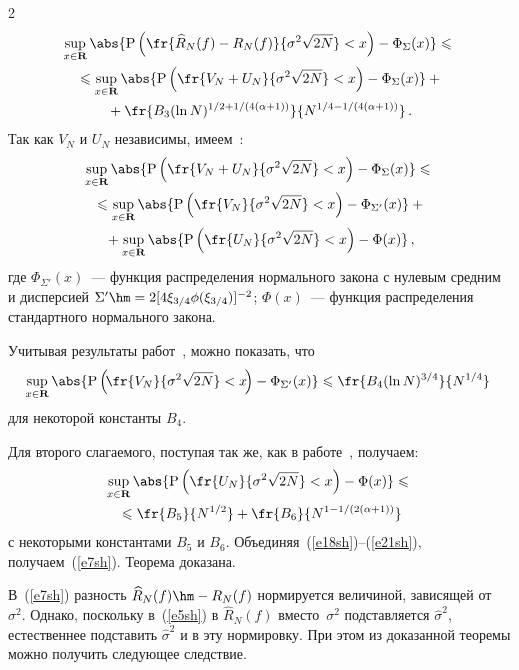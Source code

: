 \begin{multicols}{2}
\noindent
\begin{multline}
\sup\limits_{x\in\mathbf{R}}\abs{\mbox{P}\left
(\fr{\widehat{R}_N(f)-R_N(f)}{\sigma^2\sqrt{2N}}<x\right)-\Phi_\Sigma(x)}\leqslant{}\\
{}\leqslant\sup\limits_{x\in\mathbf{R}}\abs{\mbox{P}\left(
\fr{V_N+U_N}{\sigma^2\sqrt{2N}}<x\right)-\Phi_\Sigma(x)}+{}\\
{}+
\fr{B_3(\ln N)^{{1}/{2}+{1}/(4(\alpha+1))}}{N^{{1}/{4}-{1}/(4(\alpha+1))}}\,.
\label{e18sh}
\end{multline}
Так как $V_N$ и $U_N$ независимы, имеем~\cite{19sh}:
\begin{multline}
\sup\limits_{x\in\mathbf{R}}\abs{\mbox{P}\left(
\fr{V_N+U_N}{\sigma^2\sqrt{2N}}<x\right)-\Phi_\Sigma(x)}\leqslant{}\\
{}\leqslant\sup\limits_{x\in\mathbf{R}}\abs{\mbox{P}\left(
\fr{V_N}{\sigma^2\sqrt{2N}}<x\right)-\Phi_{\Sigma'}(x)}+{}\\
{}+
\sup\limits_{x\in\mathbf{R}}\abs{\mbox{P}\left(
\fr{U_N}{\sigma^2\sqrt{2N}}<x\right)-\Phi(x)}\,,\label{e19sh}
\end{multline}
где $\Phi_{\Sigma'}(x)$~--- функция распределения нормального закона с нулевым средним 
и дисперсией $\Sigma'\hm=2[4\xi_{3/4}\phi(\xi_{3/4})]^{-2}$; $\Phi(x)$~--- 
функция распределения стандартного нормального закона.

Учитывая результаты работ~\cite{12sh, 16sh}, можно показать, что
\begin{equation}
\hspace*{-2mm}\sup\limits_{x\in\mathbf{R}}\abs{\mbox{P}\left(\!
\fr{V_N}{\sigma^2\sqrt{2N}}<x\!\right)-\Phi_{\Sigma'}(x)}\leqslant
\fr{B_4(\ln N)^{{3}/{4}}}{N^{{1}/{4}}}\!\!\label{e20sh}
\end{equation}
для некоторой константы $B_4$.

Для второго слагаемого, поступая так же, как в работе~\cite{8sh}, получаем:
\begin{multline}
\sup\limits_{x\in\mathbf{R}}\abs{\mbox{P}\left(
\fr{U_N}{\sigma^2\sqrt{2N}}<x\right)-\Phi(x)}\leqslant{}\\
{}\leqslant
\fr{B_5}{N^{{1}/{2}}}+\fr{B_6}{N^{1-1/(2(\alpha+1))}}\label{e21sh}
\end{multline}
с некоторыми константами $B_5$ и $B_6$.
Объединяя~(\ref{e18sh})--(\ref{e21sh}), получаем~(\ref{e7sh}). 
Теорема доказана.

\smallskip

В~(\ref{e7sh}) разность $\widehat{R}_N(f)\hm-R_N(f)$ нормируется величиной, зависящей 
от~$\sigma^2$. Однако, поскольку в~(\ref{e5sh}) в $\widehat{R}_N(f)$ вместо~$\sigma^2$ 
подставляется $\hat{\sigma}^2$, естественнее подставить $\hat{\sigma}^2$ и в эту нормировку. 
При этом из доказанной теоремы можно получить следующее следствие.


\end{multicols}
